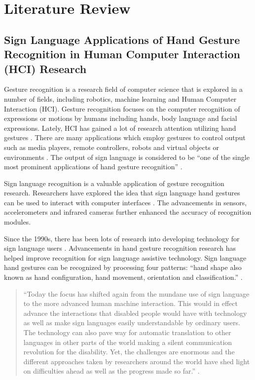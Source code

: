 \chapter{Literature Review}

\section{Sign Language Applications of Hand Gesture Recognition in Human Computer Interaction (HCI) Research}

Gesture recognition is a research field of computer science that is explored in a number of fields, including robotics, machine learning and Human Computer Interaction (HCI). Gesture recognition focuses on the computer recognition of expressions or motions by humans including hands, body language and facial expressions. Lately, HCI has gained a lot of research attention utilizing hand gestures  \parencite{Chen2003}. There are many applications which employ gestures to control output such as media players, remote controllers, robots and virtual objects or environments  \parencite{Mantyjarvi2004} \parencite{Ong2005}. The output of sign language is considered to be ``one of the single most prominent applications of hand gesture recognition'' \parencite{Premaratne2010}.

Sign language recognition is a valuable application of gesture recognition research. Researchers have explored the idea that sign language hand gestures can be used to interact with computer interfaces \parencite{Premaratne2010}. The advancements in sensors, accelerometers and infrared cameras further enhanced the accuracy of recognition modules.

Since the 1990s, there has been lots of research into developing technology for sign language users \parencite{Starner1998}. Advancements in hand gesture recognition research has helped improve recognition for sign language assistive technology. Sign language hand gestures can be recognized by processing four patterns: ``hand shape also known as hand configuration, hand movement, orientation and classification.'' \parencite{Zhang2009}.

\begin{quote}
  ``Today the focus has shifted again from the mundane use of sign language to the more advanced human machine interaction. This would in effect advance the interactions that disabled people would have with technology as well as make sign languages easily understandable by ordinary users. The technology can also pave way for automatic translation to other languages in other parts of the world making a silent communication revolution for the disability. Yet, the challenges are enormous and the different approaches taken by researchers around the world have shed light on difficulties ahead as well as the progress made so far.'' \parencite{Premaratne2010}. 
\end{quote}

